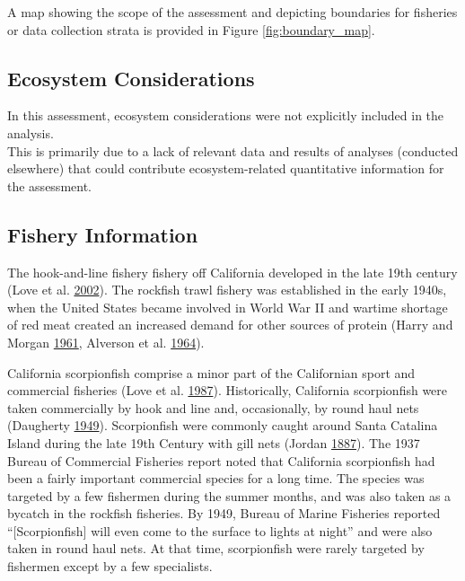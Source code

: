 \documentclass[12pt,]{article}
\begin{document}
A map showing the scope of the assessment and depicting boundaries for
fisheries or data collection strata is provided in Figure
\ref{fig:boundary_map}.

\subsection{Ecosystem Considerations}\label{ecosystem-considerations-1}

In this assessment, ecosystem considerations were not explicitly
included in the analysis.\\
This is primarily due to a lack of relevant data and results of analyses
(conducted elsewhere) that could contribute ecosystem-related
quantitative information for the assessment.

\subsection{Fishery Information}\label{fishery-information}

The hook-and-line fishery fishery off California developed in the late
19th century (Love et al. \protect\hyperlink{ref-Love2002}{2002}). The
rockfish trawl fishery was established in the early 1940s, when the
United States became involved in World War II and wartime shortage of
red meat created an increased demand for other sources of protein (Harry
and Morgan \protect\hyperlink{ref-Harry1961}{1961}, Alverson et al.
\protect\hyperlink{ref-Alverson1964}{1964}).

California scorpionfish comprise a minor part of the Californian sport
and commercial fisheries (Love et al.
\protect\hyperlink{ref-Love1987}{1987}). Historically, California
scorpionfish were taken commercially by hook and line and, occasionally,
by round haul nets (Daugherty
\protect\hyperlink{ref-Daugherty1949}{1949}). Scorpionfish were commonly
caught around Santa Catalina Island during the late 19th Century with
gill nets (Jordan \protect\hyperlink{ref-Jordan1887}{1887}). The 1937
Bureau of Commercial Fisheries report noted that California scorpionfish
had been a fairly important commercial species for a long time. The
species was targeted by a few fishermen during the summer months, and
was also taken as a bycatch in the rockfish fisheries. By 1949, Bureau
of Marine Fisheries reported ``{[}Scorpionfish{]} will even come to the
surface to lights at night'' and were also taken in round haul nets. At
that time, scorpionfish were rarely targeted by fishermen except by a
few specialists.
\end{document}
